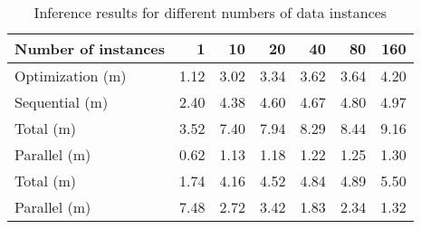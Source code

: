 \begin{table*}
  \centering
  \caption{Inference results for different numbers of data instances}
  \ttfamily
  \begin{tabular}{lrrrrrr}
    \toprule
    \textnormal{Number of instances} &    1 &   10 &   20 &   40 &   80 &  160 \\
    \midrule
    \textnormal{Optimization (m)}    & 1.12 & 3.02 & 3.34 & 3.62 & 3.64 & 4.20 \\
    \midrule
    \textnormal{Sequential (m)}      & 2.40 & 4.38 & 4.60 & 4.67 & 4.80 & 4.97 \\
    \textnormal{Total (m)}           & 3.52 & 7.40 & 7.94 & 8.29 & 8.44 & 9.16 \\
    \midrule
    \textnormal{Parallel (m)}        & 0.62 & 1.13 & 1.18 & 1.22 & 1.25 & 1.30 \\
    \textnormal{Total (m)}           & 1.74 & 4.16 & 4.52 & 4.84 & 4.89 & 5.50 \\
    \midrule
    \textnormal{Parallel (m)}        & 7.48 & 2.72 & 3.42 & 1.83 & 2.34 & 1.32 \\
    \bottomrule
  \end{tabular}
\end{table*}
